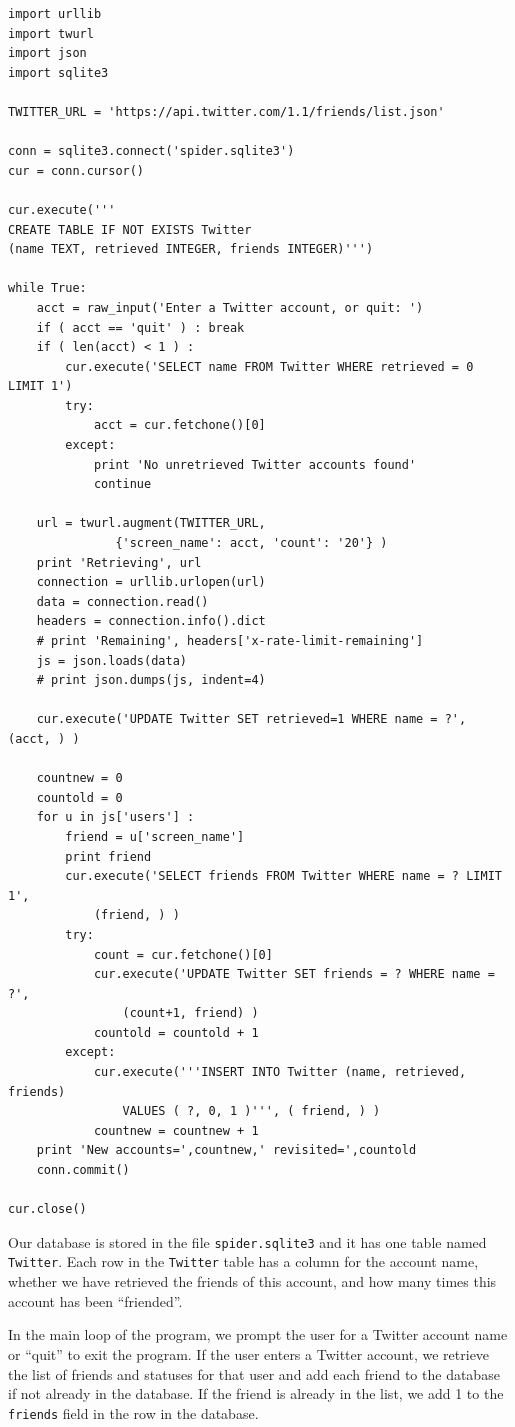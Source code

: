 \beforeverb
\begin{verbatim}
import urllib
import twurl
import json
import sqlite3

TWITTER_URL = 'https://api.twitter.com/1.1/friends/list.json'

conn = sqlite3.connect('spider.sqlite3')
cur = conn.cursor()

cur.execute('''
CREATE TABLE IF NOT EXISTS Twitter 
(name TEXT, retrieved INTEGER, friends INTEGER)''')

while True:
    acct = raw_input('Enter a Twitter account, or quit: ')
    if ( acct == 'quit' ) : break
    if ( len(acct) < 1 ) :
        cur.execute('SELECT name FROM Twitter WHERE retrieved = 0 LIMIT 1')
        try:
            acct = cur.fetchone()[0]
        except:
            print 'No unretrieved Twitter accounts found'
            continue

    url = twurl.augment(TWITTER_URL, 
               {'screen_name': acct, 'count': '20'} )
    print 'Retrieving', url
    connection = urllib.urlopen(url)
    data = connection.read()
    headers = connection.info().dict
    # print 'Remaining', headers['x-rate-limit-remaining']
    js = json.loads(data)
    # print json.dumps(js, indent=4)

    cur.execute('UPDATE Twitter SET retrieved=1 WHERE name = ?', (acct, ) )

    countnew = 0
    countold = 0
    for u in js['users'] :
        friend = u['screen_name']
        print friend
        cur.execute('SELECT friends FROM Twitter WHERE name = ? LIMIT 1', 
            (friend, ) )
        try:
            count = cur.fetchone()[0]
            cur.execute('UPDATE Twitter SET friends = ? WHERE name = ?', 
                (count+1, friend) )
            countold = countold + 1
        except:
            cur.execute('''INSERT INTO Twitter (name, retrieved, friends) 
                VALUES ( ?, 0, 1 )''', ( friend, ) )
            countnew = countnew + 1
    print 'New accounts=',countnew,' revisited=',countold
    conn.commit()

cur.close()
\end{verbatim}
\afterverb
%
Our database is stored in the file {\tt spider.sqlite3} and it has one 
table named {\tt Twitter}.  Each row in the {\tt Twitter} table
has a column for the account name, whether we have retrieved the friends
of this account, and how many times this account has been ``friended''.

In the main loop of the program, we prompt the user for a Twitter
account name or ``quit'' to exit the program.  
If the user enters a Twitter account, we retrieve the 
list of friends and statuses
for that user and add each friend to the database if 
not already in the database.  If the friend is already in the list, 
we add 1 to the {\tt friends} field in the row in the database.

